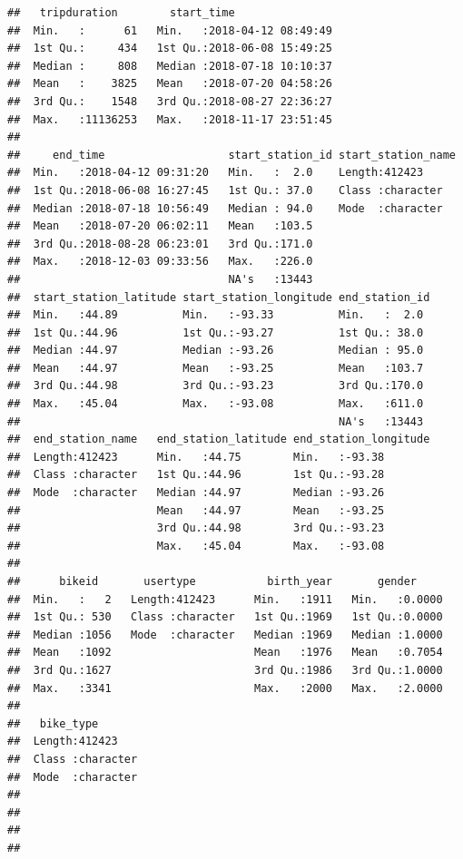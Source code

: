 \documentclass[]{book}
\begin{document}
\begin{verbatim}
##   tripduration        start_time                 
##  Min.   :      61   Min.   :2018-04-12 08:49:49  
##  1st Qu.:     434   1st Qu.:2018-06-08 15:49:25  
##  Median :     808   Median :2018-07-18 10:10:37  
##  Mean   :    3825   Mean   :2018-07-20 04:58:26  
##  3rd Qu.:    1548   3rd Qu.:2018-08-27 22:36:27  
##  Max.   :11136253   Max.   :2018-11-17 23:51:45  
##                                                  
##     end_time                   start_station_id start_station_name
##  Min.   :2018-04-12 09:31:20   Min.   :  2.0    Length:412423     
##  1st Qu.:2018-06-08 16:27:45   1st Qu.: 37.0    Class :character  
##  Median :2018-07-18 10:56:49   Median : 94.0    Mode  :character  
##  Mean   :2018-07-20 06:02:11   Mean   :103.5                      
##  3rd Qu.:2018-08-28 06:23:01   3rd Qu.:171.0                      
##  Max.   :2018-12-03 09:33:56   Max.   :226.0                      
##                                NA's   :13443                      
##  start_station_latitude start_station_longitude end_station_id 
##  Min.   :44.89          Min.   :-93.33          Min.   :  2.0  
##  1st Qu.:44.96          1st Qu.:-93.27          1st Qu.: 38.0  
##  Median :44.97          Median :-93.26          Median : 95.0  
##  Mean   :44.97          Mean   :-93.25          Mean   :103.7  
##  3rd Qu.:44.98          3rd Qu.:-93.23          3rd Qu.:170.0  
##  Max.   :45.04          Max.   :-93.08          Max.   :611.0  
##                                                 NA's   :13443  
##  end_station_name   end_station_latitude end_station_longitude
##  Length:412423      Min.   :44.75        Min.   :-93.38       
##  Class :character   1st Qu.:44.96        1st Qu.:-93.28       
##  Mode  :character   Median :44.97        Median :-93.26       
##                     Mean   :44.97        Mean   :-93.25       
##                     3rd Qu.:44.98        3rd Qu.:-93.23       
##                     Max.   :45.04        Max.   :-93.08       
##                                                               
##      bikeid       usertype           birth_year       gender      
##  Min.   :   2   Length:412423      Min.   :1911   Min.   :0.0000  
##  1st Qu.: 530   Class :character   1st Qu.:1969   1st Qu.:0.0000  
##  Median :1056   Mode  :character   Median :1969   Median :1.0000  
##  Mean   :1092                      Mean   :1976   Mean   :0.7054  
##  3rd Qu.:1627                      3rd Qu.:1986   3rd Qu.:1.0000  
##  Max.   :3341                      Max.   :2000   Max.   :2.0000  
##                                                                   
##   bike_type        
##  Length:412423     
##  Class :character  
##  Mode  :character  
##                    
##                    
##                    
## 
\end{verbatim}
\end{document}
